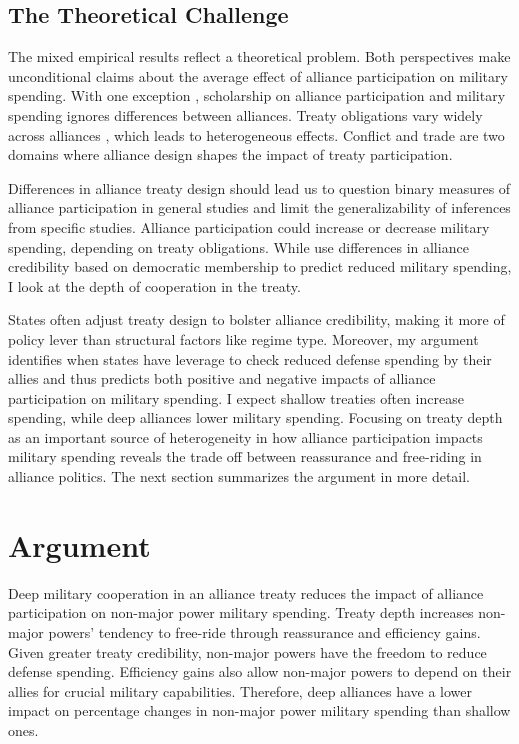 \documentclass[12pt]{article}
\begin{document}
\subsection{The Theoretical Challenge}


The mixed empirical results reflect a theoretical problem. 
Both perspectives make unconditional claims about the average effect of alliance participation on military spending.  
With one exception \citep{DigiuseppePoast2016}, scholarship on alliance participation and military spending ignores differences between alliances.
Treaty obligations vary widely across alliances \citep{Leedsetal2002}, which leads to heterogeneous effects. 
Conflict \citep{Leeds2003, Benson2012} and trade \citep{Long2003, LongLeeds2006} are two domains where alliance design shapes the impact of treaty participation. 


Differences in alliance treaty design should lead us to question binary measures of alliance participation in general studies and limit the generalizability of inferences from specific studies. 
Alliance participation could increase or decrease military spending, depending on treaty obligations. 
While \citet{DigiuseppePoast2016} use differences in alliance credibility based on democratic membership to predict reduced military spending, I look at the depth of cooperation in the treaty. 


States often adjust treaty design to bolster alliance credibility, making it more of policy lever than structural factors like regime type. 
Moreover, my argument identifies when states have leverage to check reduced defense spending by their allies and thus predicts both positive and negative impacts of alliance participation on military spending. 
I expect shallow treaties often increase spending, while deep alliances lower military spending. 
Focusing on treaty depth as an important source of heterogeneity in how alliance participation impacts military spending reveals the trade off between reassurance and free-riding in alliance politics.  
The next section summarizes the argument in more detail. 



\section{Argument}

Deep military cooperation in an alliance treaty reduces the impact of alliance participation on non-major power military spending.
Treaty depth increases non-major powers' tendency to free-ride through reassurance and efficiency gains. 
Given greater treaty credibility, non-major powers have the freedom to reduce defense spending.
Efficiency gains also allow non-major powers to depend on their allies for crucial military capabilities.   
Therefore, deep alliances have a lower impact on percentage changes in non-major power military spending than shallow ones. 
\end{document}
